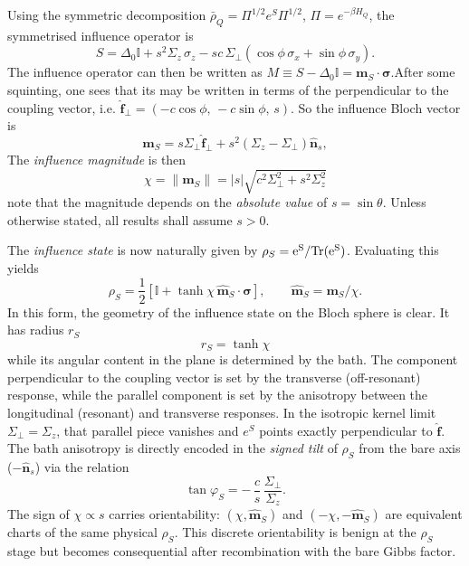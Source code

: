 Using the symmetric decomposition
\(\bar\rho_Q=\Pi^{1/2}e^S\Pi^{1/2}\), \(\Pi=e^{-\beta H_Q}\), the symmetrised influence operator is
\begin{equation}
    S=\Delta_0\mathbb I
    +s^2\Sigma_z\,\sigma_z
    -sc\,\Sigma_\perp(\cos\phi\,\sigma_x+\sin\phi\,\sigma_y).
    \label{eq:S_symmetrised_v3}
\end{equation}
The influence operator can then be written as \(M\equiv S-\Delta_0\mathbb I = \mathbf m_S\!\cdot\!\boldsymbol{\sigma}\).After some squinting, one sees that its may be written in terms of the perpendicular to the coupling vector, i.e. $\hat{\mathbf f}_\perp = (-c\cos\phi,\,-c\sin\phi,\,s)$. So the influence Bloch vector is
\begin{equation}
    \mathbf m_S=
    s\Sigma_\perp\hat{\mathbf f}_\perp + s^2(\Sigma_z-\Sigma_\perp)\hat{\mathbf n}_s,
    \label{eq:mS_decomposition}
\end{equation}
 The \emph{influence magnitude} is then
\begin{equation}
    \chi=\|\mathbf m_S\|
    =|s|\sqrt{c^2\Sigma_\perp^2+s^2\Sigma_z^2}
    \label{eq:chi_factored}
\end{equation}
note that the magnitude depends on the \emph{absolute value} of $s=\sin\theta$. Unless otherwise stated, all results shall assume $s>0$.

The \emph{influence state} is now naturally given by $\rho_S = \rm{e}^S/\mathrm{Tr}(\rm{e}^S)$. Evaluating this yields
\begin{equation}
    \rho_S=\frac{1}{2}\!\left[\mathbb I+\tanh\chi\,\hat{\mathbf m}_S\!\cdot\!\boldsymbol{\sigma}\right],
    \qquad
    \hat{\mathbf m}_S=\mathbf m_S/\chi.
    \label{eq:expS_closed}
\end{equation}
In this form, the geometry of the influence state on the Bloch sphere is clear. It has radius $r_S$
\begin{equation}
    r_S = \tanh\chi
\end{equation} 
while its angular content in the plane is determined by the bath. The component perpendicular to the coupling vector is set by the transverse (off-resonant) response, while the parallel component is set by the anisotropy between the longitudinal (resonant) and transverse responses. In the isotropic kernel limit \(\Sigma_\perp=\Sigma_z\), that parallel piece vanishes and \(e^S\) points exactly perpendicular to \(\hat{\mathbf f}\). The bath anisotropy is directly encoded in the \emph{signed tilt} of $\rho_S$ from the bare axis (\(-\hat{\mathbf n}_s\)) via the relation
\begin{equation}
    \tan\varphi_S=-\,\frac{c}{s}\,\frac{\Sigma_\perp}{\Sigma_z}.
    \label{eq:phiS_def}
\end{equation}
The sign of \(\chi\propto s\) carries orientability: \((\chi,\hat{\mathbf m}_S)\) and
\((-\chi,-\hat{\mathbf m}_S)\) are equivalent charts of the same physical \(\rho_S\). This discrete
orientability is benign at the \(\rho_S\) stage but becomes consequential after recombination with the
bare Gibbs factor.

